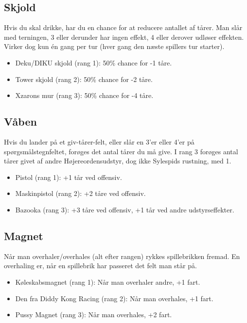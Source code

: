 \documentclass{article}
\begin{document}
\subsection{Skjold}
Hvis du skal drikke, har du en chance for at reducere antallet af tårer. Man slår med terningen, 3 eller derunder har ingen effekt, 4 eller derover udløser effekten. Virker dog kun én gang per tur (hver gang den næste spillers tur starter).

\begin{itemize}
	\item Deku/DIKU skjold (rang 1): 50\% chance for -1 tåre.
	\item Tower skjold (rang 2): 50\% chance for -2 tåre.
	\item Xzarons mur (rang 3): 50\% chance for -4 tåre.
\end{itemize}
 
\subsection{Våben} Hvis du lander på et giv-tårer-felt, eller slår en 3’er eller 4’er på spørgsmålstegnfeltet, forøges det antal tårer du må give. I rang 3 forøges antal tårer givet af andre Højereordensudstyr, dog ikke Sylespids rustning, med 1.

\begin{itemize}
	\item Pistol (rang 1): +1 tår ved offensiv.
	\item Maskinpistol (rang 2): +2 tåre ved offensiv.
	\item Bazooka (rang 3): +3 tåre ved offensiv, +1 tår ved andre udstyrseffekter.
\end{itemize}
 
\subsection{Magnet}
Når man overhaler/overhales (alt efter rangen) rykkes spillebrikken fremad. En overhaling er, når en spillebrik har passeret det felt man står på.

\begin{itemize}
	\item Køleskabsmagnet (rang 1): Når man overhaler andre, +1 fart.
	\item Den fra Diddy Kong Racing (rang 2): Når man overhales, +1 fart.
	\item Pussy Magnet (rang 3): Når man overhales, +2 fart.
\end{itemize}
 
\end{document}
